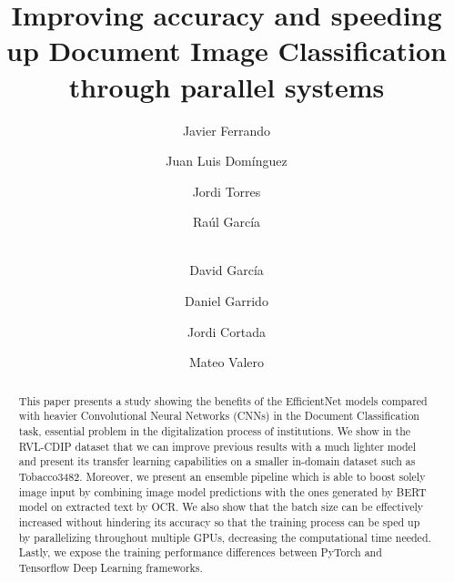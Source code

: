 \documentclass[runningheads]{llncs}
\begin{document}
\title{Improving accuracy and speeding up Document Image Classification through parallel systems}
\author{Javier Ferrando \and Juan Luis Domínguez \and Jordi Torres \and Raúl García \and \\David García \and Daniel Garrido \and Jordi Cortada \and Mateo Valero
}

\maketitle              \begin{abstract}
This paper presents a study showing the benefits of the EfficientNet models compared with heavier Convolutional Neural Networks (CNNs) in the Document Classification task, essential problem in the digitalization process of institutions. We show in the RVL-CDIP dataset that we can improve previous results with a much lighter model and present its transfer learning capabilities on a smaller in-domain dataset such as Tobacco3482. Moreover, we present an ensemble pipeline which is able to boost solely image input by combining image model predictions with the ones generated by BERT model on extracted text by OCR. We also show that the batch size can be effectively increased without hindering its accuracy so that the training process can be sped up by parallelizing throughout multiple GPUs, decreasing the computational time needed. Lastly, we expose the training performance differences between PyTorch and Tensorflow Deep Learning frameworks.



\end{abstract}
\end{document}
